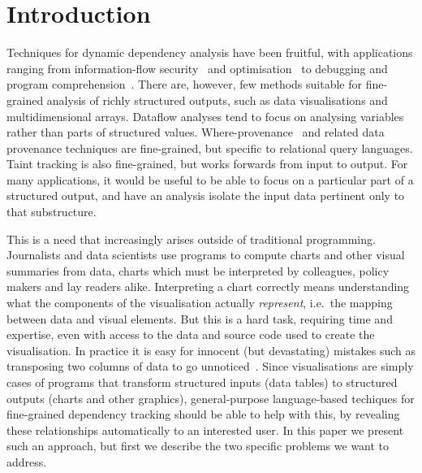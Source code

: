 \section{Introduction}
\label{sec:introduction}

Techniques for dynamic dependency analysis have been fruitful, with applications ranging from information-flow security~\cite{sabelfeld03} and optimisation~\cite{kildall73} to debugging and program comprehension~\cite{weiser81,delucia96}. There are, however, few methods suitable for fine-grained analysis of richly structured outputs, such as data visualisations and multidimensional arrays. Dataflow analyses \cite{reps95} tend to focus on analysing variables rather than parts of structured values. Where-provenance~\cite{buneman01} and related data provenance techniques are fine-grained, but specific to relational query languages. Taint tracking \cite{newsome05} is also fine-grained, but works forwards from input to output. For many applications, it would be useful to be able to focus on a particular part of a structured output, and have an analysis isolate the input data pertinent only to that substructure.

This is a need that increasingly arises outside of traditional programming. Journalists and data scientists use programs to compute charts and other visual summaries from data, charts which must be interpreted by colleagues, policy makers and lay readers alike. Interpreting a chart correctly means understanding what the components of the visualisation actually \emph{represent}, i.e.~the mapping between data and visual elements. But this is a hard task, requiring time and expertise, even with access to the data and source code used to create the visualisation. In practice it is easy for innocent (but devastating) mistakes such as transposing two columns of data to go unnoticed~\cite{miller06}. Since visualisations are simply cases of programs that transform structured inputs (data tables) to structured outputs (charts and other graphics), general-purpose language-based techiques for fine-grained dependency tracking should be able to help with this, by revealing these relationships automatically to an interested user. In this paper we present such an approach, but first we describe the two specific problems we want to address.

